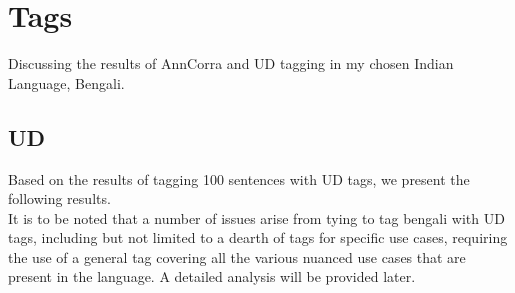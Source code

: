 \documentclass[a4 paper]{article}
\begin{document}

\tableofcontents

\section{Tags}

Discussing the results of AnnCorra and UD tagging in my chosen Indian Language,
Bengali.

\subsection{UD}

Based on the results of tagging 100 sentences with UD tags, we present the
following results.\\
It is to be noted that a number of issues arise from tying to tag bengali with
UD tags, including but not limited to a dearth of tags for specific use cases,
requiring the use of a general tag covering all the various nuanced use cases
that are present in the language. A detailed analysis will be provided later.
\end{document}
